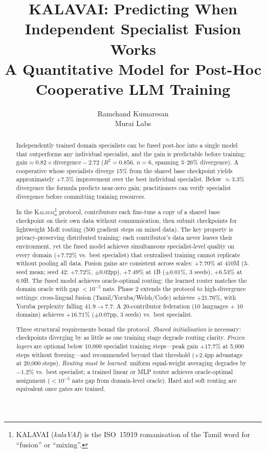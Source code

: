 \documentclass{article}
\title{KALAVAI: Predicting When Independent Specialist Fusion Works\\
       A Quantitative Model for Post-Hoc Cooperative LLM Training}
\author{%
  Ramchand Kumaresan \\
  Murai Labs
}
\newcommand{\kalavai}{\textsc{Kalavai}\xspace}
\begin{document}
\maketitle

\begin{abstract}
Independently trained domain specialists can be fused post-hoc into a single model that outperforms any individual specialist, and the gain is predictable before training:
$\text{gain} \approx 0.82 \times \text{divergence} - 2.72$ ($R^2 = 0.856$, $n=6$, spanning 3--26\% divergence).
A cooperative whose specialists diverge 15\% from the shared base checkpoint yields approximately $+7.5\%$ improvement over the best individual specialist.
Below $\approx$3.3\% divergence the formula predicts near-zero gain; practitioners can verify specialist divergence before committing training resources.

In the \kalavai\footnote{KALAVAI (\textit{kalaVAI}) is the ISO~15919 romanisation of the Tamil word for ``fusion'' or ``mixing''.} protocol, contributors each fine-tune a copy of a shared base checkpoint on their own data without communication, then submit checkpoints for lightweight MoE routing (500 gradient steps on mixed data).
The key property is privacy-preserving distributed training: each contributor's data never leaves their environment, yet the fused model achieves simultaneous specialist-level quality on every domain ($+7.72\%$ vs.\ best specialist) that centralised training cannot replicate without pooling all data.
Fusion gains are consistent across scales: $+7.70\%$ at 410M (3-seed mean; seed 42: $+7.72\%$, $\pm$0.02pp), $+7.49\%$ at 1B ($\pm$0.01\%, 3 seeds), $+6.53\%$ at 6.9B.
The fused model achieves oracle-optimal routing: the learned router matches the domain oracle with gap $<10^{-5}$ nats.
Phase 2 extends the protocol to high-divergence settings: cross-lingual fusion (Tamil/Yoruba/Welsh/Code) achieves $+21.76\%$, with Yoruba perplexity falling $41.9\to7.7$.
A 20-contributor federation (10 languages + 10 domains) achieves $+16.71\%$ ($\pm$0.07pp, 3 seeds) vs.\ best specialist.

Three structural requirements bound the protocol. \emph{Shared initialisation} is necessary: checkpoints diverging by as little as one training stage degrade routing clarity. \emph{Frozen layers} are optional below 10,000 specialist training steps---peak gain $+17.7\%$ at 5,000 steps without freezing---and recommended beyond that threshold ($+2.4$pp advantage at 20,000 steps). \emph{Routing must be learned}: uniform equal-weight averaging degrades by $-1.2\%$ vs.\ best specialist; a trained linear or MLP router achieves oracle-optimal assignment ($<10^{-5}$ nats gap from domain-level oracle). Hard and soft routing are equivalent once gates are trained.
\end{abstract}
\end{document}
